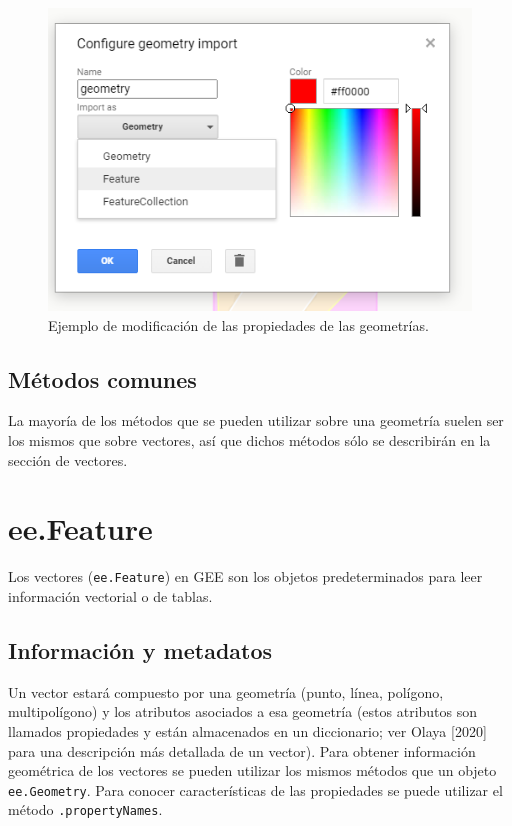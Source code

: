 \documentclass[
  12pt,
  letterpaper,
  twoside]{book}
\begin{document}
\begin{figure}[btp]

{\centering \includegraphics[width=0.8\linewidth]{Img/menuGeo} 

}

\caption{Ejemplo de modificación de las propiedades de las geometrías.}\label{fig:unnamed-chunk-65}
\end{figure}

\hypertarget{muxe9todos-comunes}{%
\section{Métodos comunes}\label{muxe9todos-comunes}}

La mayoría de los métodos que se pueden utilizar sobre una geometría suelen ser los mismos que sobre vectores, así que dichos métodos sólo se describirán en la sección de vectores.

\newpage

\hypertarget{ee.feature}{%
\chapter{ee.Feature}\label{ee.feature}}

Los vectores (\texttt{ee.Feature}) en GEE son los objetos predeterminados para leer información vectorial o de tablas.

\hypertarget{informaciuxf3n-y-metadatos-1}{%
\section{Información y metadatos}\label{informaciuxf3n-y-metadatos-1}}

Un vector estará compuesto por una geometría (punto, línea, polígono, multipolígono) y los atributos asociados a esa geometría (estos atributos son llamados propiedades y están almacenados en un diccionario; ver Olaya {[}2020{]} para una descripción más detallada de un vector). Para obtener información geométrica de los vectores se pueden utilizar los mismos métodos que un objeto \texttt{ee.Geometry}. Para conocer características de las propiedades se puede utilizar el método \texttt{.propertyNames}.
\end{document}
